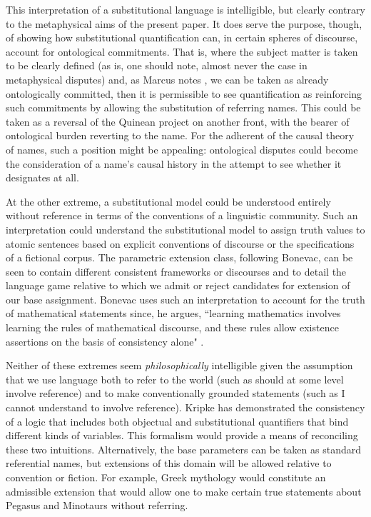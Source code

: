 \documentclass[12pt,a4paper]{article}
\begin{document}
This interpretation of a substitutional language is intelligible, but
clearly contrary to the metaphysical aims of the present paper.  It
does serve the purpose, though, of showing how substitutional
quantification can, in certain spheres of discourse, account for
ontological commitments.  That is, where the subject matter is taken
to be clearly defined (as is, one should note, almost never the case
in metaphysical disputes) and, as Marcus notes \cite{marcus72}, we can
be taken as already ontologically committed, then it is permissible to
see quantification as reinforcing such commitments by allowing the
substitution of referring names. This could be taken as a reversal of
the Quinean project on another front, with the bearer of ontological
burden reverting to the name.  For the adherent of the causal theory
of names, such a position might be appealing: ontological disputes
could become the consideration of a name's causal history in the
attempt to see whether it designates at all.

At the other extreme, a substitutional model could be understood
entirely without reference in terms of the conventions of a linguistic
community.  Such an interpretation could understand the substitutional
model to assign truth values to atomic sentences based on explicit
conventions of discourse or the specifications of a fictional corpus.
The parametric extension class, following Bonevac, can be seen to
contain different consistent frameworks or discourses and to detail
the language game relative to which we admit or reject candidates for
extension of our base assignment.  Bonevac uses such an
interpretation to account for the truth of mathematical statements
since, he argues, ``learning mathematics involves learning the rules
of mathematical discourse, and these rules allow existence assertions
on the basis of consistency alone" \cite[p.650]{bonevac84}.

Neither of these extremes seem \emph{philosophically} intelligible
given the assumption that we use language both to refer to the world
(such as should at some level involve reference) and to make
conventionally grounded statements (such as I cannot understand to
involve reference).  Kripke \cite{kripke} has demonstrated the
consistency of a logic that includes both objectual and substitutional
quantifiers that bind different kinds of variables. This formalism
would provide a means of reconciling these two intuitions.
Alternatively, the base parameters can be taken as standard
referential names, but extensions of this domain will be allowed
relative to convention or fiction.  For example, Greek mythology would
constitute an admissible extension that would allow one to make
certain true statements about Pegasus and Minotaurs without referring.
\end{document}
